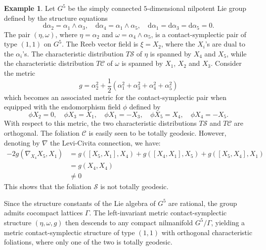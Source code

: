 \documentclass[12pt]{amsart}
\theoremstyle{definition}
\newtheorem{example}[theorem]{Example}
\theoremstyle{remark}
\begin{document}
\begin{example}
Let $G^5$ be the simply connected $5$-dimensional nilpotent Lie group defined by the structure equations
 \begin{equation*}
 \mathrm{d}\alpha_2=\alpha_1\wedge \alpha_3, \quad  \mathrm{d}\alpha_4=\alpha_1\wedge \alpha_5, \quad
 \mathrm{d}\alpha_1= \mathrm{d}\alpha_3= \mathrm{d}\alpha_5=0.
  \end{equation*}
The pair  $(\eta, \omega)$, where $\eta=\alpha_2$ and $\omega=\alpha_4\wedge \alpha_5$, is a contact-symplectic pair of type $(1,1)$ on $G^5$.  
The Reeb vector field is $\xi=X_2$, where the $X_i$'s are dual to the $\alpha_i$'s.
The characteristic distribution $T\mathcal{S}$ of $\eta$ is spanned by $X_4$ and $X_5$, while the characteristic distribution $T\mathcal{C}$  of $\omega$ is spanned by   $X_1$, $X_2$ and $X_3$.
Consider the metric
\begin{equation*}
g=\alpha_2^2+\frac{1}{2}\left( \alpha_1^2+\alpha_3^2+\alpha_4^2+\alpha_5^2 \right)
 \end{equation*}
which becomes an associated metric for the contact-symplectic pair when equipped with the endomorphism field $\phi$ defined by
\begin{equation*}
\phi X_2=0 ,\quad  \phi X_ 3=X_1 ,\quad \phi X_1 =-X_3 ,\quad \phi X_ 5=X_4,\quad \phi X_4 =-X_5 .
 \end{equation*}
With respect to this metric, the two characteristic distributions $T\mathcal{S}$ and $T\mathcal{C}$ are orthogonal.
The foliation $\mathcal{C}$ is easily seen to be totally geodesic.
However, denoting by $\nabla$ the Levi-Civita connection, we have:
\begin{align*}
 	  -2 g(\nabla_{X_4}X_5, X_1 )&=  g([X_5,X_1],X_4) + g([X_4,X_1],X_5)  +g([X_5,X_4],X_1)  \\
	                                              &= g(X_4,X_4)  \\
	                                              &\neq 0
  \end{align*}
This shows that the foliation $\mathcal{S}$ is not totally geodesic.

\medskip 
\noindent
Since the structure constants of the Lie algebra of $G^5$ are rational, the group admits cocompact lattices $\Gamma$. The left-invariant metric contact-symplectic structure $(\eta, \omega, g)$ then descends to any compact nilmanifold $G^5/\Gamma$, yielding a metric contact-symplectic structure of type $(1,1)$ with orthogonal characteristic foliations, where only one of the two is totally geodesic.

\end{example}
\end{document}
